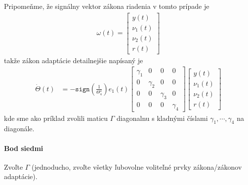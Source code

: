 \documentclass[a4paper, 10pt, ]{article}
\begin{document}
Pripomeňme, že signálny vektor zákona riadenia v tomto prípade je
\begin{align}
    \omega(t) =
    \begin{bmatrix}
          y(t) \\ \nu_1(t) \\ \nu_2(t) \\  r(t)
    \end{bmatrix}
\end{align}
takže zákon adaptácie detailnejšie napísaný je
\begin{align}
    \dot \Theta(t) &=
    - \texttt{sign}\left(\frac{1}{\Theta_4^\star}\right)
    e_1(t)
    \begin{bmatrix}
        \gamma_1 & 0 & 0 & 0 \\
        0 & \gamma_2 & 0 & 0 \\
        0 & 0 & \gamma_3 & 0 \\
        0 & 0 & 0 & \gamma_4
    \end{bmatrix}
    \begin{bmatrix}
          y(t) \\ \nu_1(t) \\ \nu_2(t) \\  r(t)
    \end{bmatrix}
\end{align}
kde sme ako príklad zvolili maticu $\Gamma$ diagonalnu s kladnými číslami $\gamma_1, \cdots, \gamma_4$ na diagonále.




















\paragraph{Bod siedmi}

\smallskip

{\color{gray}

Zvoľte $\Gamma$ (jednoducho, zvoľte všetky ľubovolne voliteľné prvky zákona/zákonov adaptácie).

}
\end{document}
